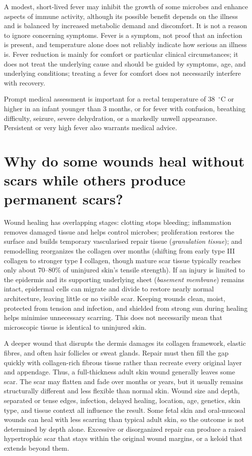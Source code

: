 \documentclass[11pt,oneside]{report}
\begin{document}
A modest, short-lived fever may inhibit the growth of some microbes and enhance
aspects of immune activity, although its possible benefit depends on the illness
and is balanced by increased metabolic demand and discomfort. It is not a reason
to ignore concerning symptoms. Fever is a symptom, not proof
that an infection is present, and temperature alone does not reliably indicate
how serious an illness is. Fever reduction is mainly for comfort or particular
clinical circumstances; it does not treat the underlying cause and should be
guided by symptoms, age, and underlying conditions; treating a fever for comfort
does not necessarily interfere with recovery.

Prompt medical assessment is important for a rectal temperature of 38~$^\circ$C
or higher in an infant younger than 3 months, or for fever with confusion,
breathing difficulty, seizure, severe dehydration, or a markedly unwell
appearance. Persistent or very high fever also warrants medical advice.

\section{Why do some wounds heal without scars while others produce permanent scars?}

Wound healing has overlapping stages: clotting stops bleeding; inflammation
removes damaged tissue and helps control microbes; proliferation restores the
surface and builds temporary vascularised repair tissue (\emph{granulation
tissue}); and remodelling reorganizes the collagen over months (shifting from
early type III collagen to stronger type I collagen, though mature scar tissue
typically reaches only about 70--80\% of uninjured skin's tensile strength). If
an injury is limited to the epidermis and its supporting underlying sheet
(\emph{basement membrane}) remains intact, epidermal cells can migrate and
divide to restore nearly normal architecture, leaving little or no visible scar.
Keeping wounds clean, moist, protected from tension and infection, and shielded
from strong sun during healing helps minimise unnecessary scarring. This
does not necessarily mean that microscopic tissue is identical to uninjured
skin.

A deeper wound that disrupts the dermis damages its collagen framework, elastic
fibres, and often hair follicles or sweat glands. Repair must then fill the gap
quickly with collagen-rich fibrous tissue rather than recreate every original
layer and appendage. Thus, a full-thickness adult skin wound generally leaves
some scar. The scar may flatten and fade over months or years, but it usually
remains structurally different and less flexible than normal skin. Wound size
and depth, separated or tense edges, infection, delayed healing, location, age,
genetics, skin type, and tissue context all influence the result. Some fetal
skin and oral-mucosal wounds can heal with less scarring than typical adult
skin, so the outcome is not determined by depth alone. Excessive or disorganized
repair can produce a raised hypertrophic scar that stays within the original
wound margins, or a keloid that extends beyond them.
\end{document}
